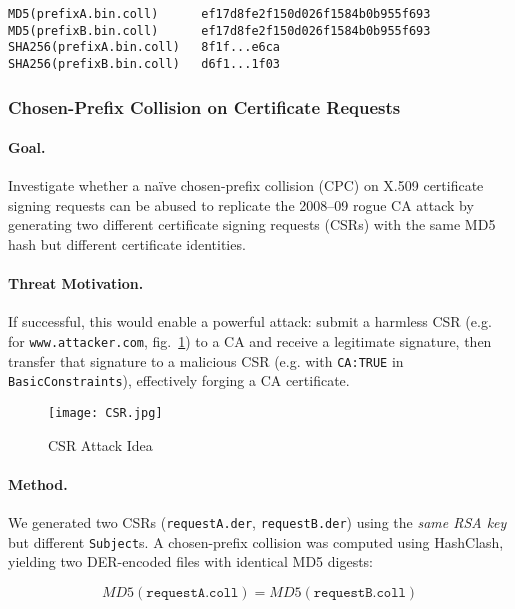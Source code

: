 \documentclass[runningheads]{llncs}
\begin{document}
    \begin{lstlisting}[style=hashblock,caption={MD5/SHA-256 of the collided pair},label={lst:cpc-easy}]
MD5(prefixA.bin.coll)      ef17d8fe2f150d026f1584b0b955f693
MD5(prefixB.bin.coll)      ef17d8fe2f150d026f1584b0b955f693
SHA256(prefixA.bin.coll)   8f1f...e6ca
SHA256(prefixB.bin.coll)   d6f1...1f03
    \end{lstlisting}

    \subsubsection{Chosen-Prefix Collision on Certificate Requests}
    \paragraph{Goal.} Investigate whether a naïve chosen-prefix collision (CPC) on X.509 certificate signing requests can be abused to replicate the 2008–09 rogue CA attack \cite{stevens2009crypto} by generating two different certificate signing requests (CSRs) with the same MD5 hash but different certificate identities.

    \paragraph{Threat Motivation.} If successful, this would enable a powerful attack: submit a harmless CSR (e.g. for \texttt{www.attacker.com}, fig.~\ref{fig:csr-idea}) to a CA and receive a legitimate signature, then transfer that signature to a malicious CSR (e.g. with \texttt{CA:TRUE} in \texttt{BasicConstraints}), effectively forging a CA certificate.

    \begin{figure}
        \centering
        \texttt{[image: CSR.jpg]}
        \caption{CSR Attack Idea}
        \label{fig:csr-idea}
    \end{figure}

    \paragraph{Method.} We generated two CSRs (\texttt{requestA.der}, \texttt{requestB.der}) using the \emph{same RSA key} but different \texttt{Subject}s. A chosen-prefix collision was computed using HashClash, yielding two DER-encoded files with identical MD5 digests:

    \[
        MD5(\texttt{requestA.coll})=MD5(\texttt{requestB.coll})
    \]
\end{document}
